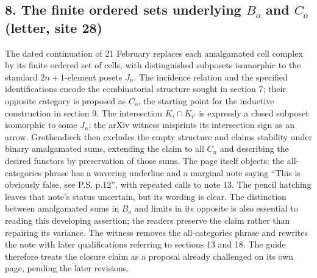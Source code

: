 \subsection*{8. The finite ordered sets underlying $B_o$ and $C_o$ (letter, site 28)}
The dated continuation of 21 February replaces each amalgamated cell complex by its finite ordered set of cells, with distinguished subposets isomorphic to the standard $2n+1$-element posets $J_n$. The incidence relation and the specified identifications encode the combinatorial structure sought in section 7; their opposite category is proposed as $C_o$, the starting point for the inductive construction in section 9. The intersection $K_i\cap K_{i'}$ is expressly a closed subposet isomorphic to some $J_n$; the arXiv witness misprints its intersection sign as an arrow. Grothendieck then excludes the empty structure and claims stability under binary amalgamated sums, extending the claim to all $C_n$ and describing the desired functors by preservation of those sums. The page itself objects: the all-categories phrase has a wavering underline and a marginal note saying ``This is obviously false, see P.S. p.12'', with repeated calls to note 13. The pencil hatching leaves that note's status uncertain, but its wording is clear. The distinction between amalgamated sums in $B_o$ and limits in its opposite is also essential to reading this developing assertion; the readers preserve the claim rather than repairing its variance. The witness removes the all-categories phrase and rewrites the note with later qualifications referring to sections 13 and 18. The guide therefore treats the closure claim as a proposal already challenged on its own page, pending the later revisions.

